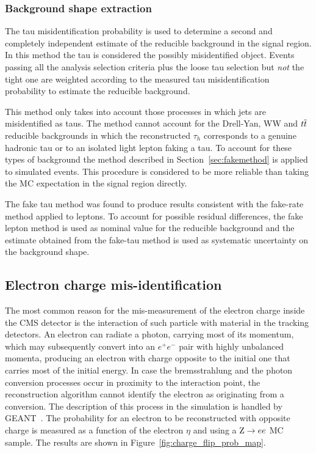 \subsubsection{Background shape extraction}

The tau misidentification probability is used to determine a second and completely independent estimate of the reducible background in the signal region.
In this method the tau is considered the possibly misidentified object. Events passing all the analysis selection criteria plus the loose tau
selection but \emph{not} the tight one are weighted according to the measured tau misidentification probability to estimate the reducible background.

This method only takes into account those processes in which jets are misidentified as taus. The method cannot account for the Drell-Yan, WW and $t\overline{t}$ reducible backgrounds
in which the reconstructed $\tau_h$ corresponds to a genuine hadronic tau or to an isolated light lepton faking a tau. To account for these types of background the method described in Section~\ref{sec:fakemethod}
is applied to simulated events. This procedure is considered to be more reliable than taking the MC expectation in the signal region directly.

The fake tau method was found to produce results consistent with the fake-rate method applied to leptons. To account for possible residual differences,
the fake lepton method is used as nominal value for the reducible background and the estimate obtained from the fake-tau method is used as systematic uncertainty on the background shape.

\subsection{Electron charge mis-identification}
\label{sec:charge_misid}

The most common reason for the mis-measurement of the electron charge inside the CMS detector is the interaction of such particle with material in the tracking detectors. %
An electron can radiate a photon, carrying most of its momentum, which may subsequently convert into an $e^+e^-$ pair with highly unbalanced momenta, producing an electron with charge opposite to the initial one that carries most of the initial energy. %
In case the bremsstrahlung and the photon conversion processes occur 
in proximity to the interaction point, the reconstruction algorithm cannot identify the electron as originating from a conversion.
The description of this process in the simulation is handled by \textsc{GEANT}~\cite{geant}. The probability for an electron to be reconstructed with opposite charge is measured as a function of the electron $\eta$ and \pT using a $\mathrm{Z} \rightarrow ee$ MC sample. The results are shown in Figure~\ref{fig:charge_flip_prob_map}.

